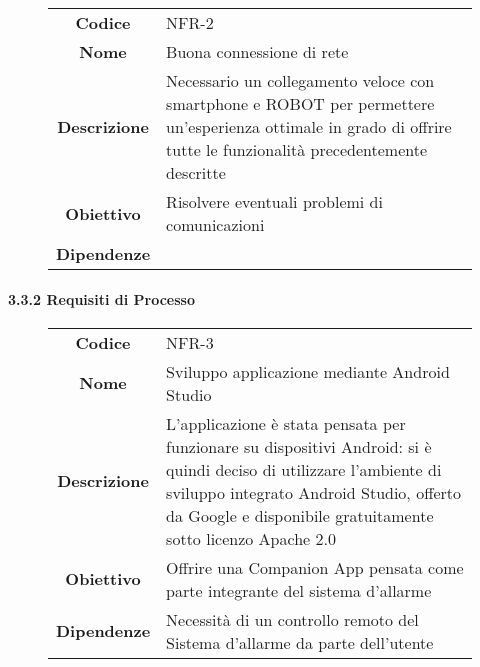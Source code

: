 \documentclass[]{article}
\let\oldparagraph\paragraph
\renewcommand{\paragraph}[1]{\oldparagraph{#1}\mbox{}}
\begin{document}
\begin{figure}[htbp]
\centering
\begin{tabular}{|c|l|}
\hline

\textbf{Codice}
 & 
NFR-2
\\

\textbf{Nome}
 & 
Buona connessione di rete
\\

\textbf{Descrizione}
 & 
Necessario un collegamento veloce con smartphone e ROBOT per permettere
un'esperienza ottimale in grado di offrire tutte le funzionalità
precedentemente descritte
\\

\textbf{Obiettivo}
 & 
Risolvere eventuali problemi di comunicazioni
\\

\textbf{Dipendenze}
 & 

\\
\hline
\end{tabular}
\end{figure}

\hypertarget{requisiti-di-processo}{%
\paragraph{3.3.2 Requisiti di Processo}\label{requisiti-di-processo}}

\begin{figure}[htbp]
\centering
\begin{tabular}{|c|l|}
\hline

\textbf{Codice}
 & 
NFR-3
\\

\textbf{Nome}
 & 
Sviluppo applicazione mediante Android Studio
\\

\textbf{Descrizione}
 & 
L'applicazione è stata pensata per funzionare su dispositivi Android: si
è quindi deciso di utilizzare l'ambiente di sviluppo integrato Android
Studio, offerto da Google e disponibile gratuitamente sotto licenzo
Apache 2.0
\\

\textbf{Obiettivo}
 & 
Offrire una Companion App pensata come parte integrante del sistema
d'allarme
\\

\textbf{Dipendenze}
 & 
Necessità di un controllo remoto del Sistema d'allarme da parte
dell'utente
\\
\hline
\end{tabular}
\end{figure}
\end{document}
